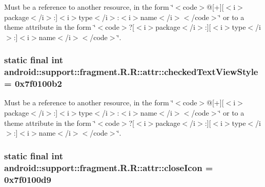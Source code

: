 Must be a reference to another resource, in the form \char`\"{}$<$code$>$@\mbox{[}+\mbox{]}\mbox{[}$<$i$>$package$<$/i$>$:\mbox{]}$<$i$>$type$<$/i$>$:$<$i$>$name$<$/i$>$$<$/code$>$\char`\"{} or to a theme attribute in the form \char`\"{}$<$code$>$?\mbox{[}$<$i$>$package$<$/i$>$:\mbox{]}\mbox{[}$<$i$>$type$<$/i$>$:\mbox{]}$<$i$>$name$<$/i$>$$<$/code$>$\char`\"{}. \hypertarget{classandroid_1_1support_1_1fragment_1_1_r_1_1attr_9e2bbe87450445856303daff538e5c41}{
\subsubsection[{checkedTextViewStyle}]{\setlength{\rightskip}{0pt plus 5cm}static final int android::support::fragment.R.R::attr::checkedTextViewStyle = 0x7f0100b2}}
\label{classandroid_1_1support_1_1fragment_1_1_r_1_1attr_9e2bbe87450445856303daff538e5c41}


Must be a reference to another resource, in the form \char`\"{}$<$code$>$@\mbox{[}+\mbox{]}\mbox{[}$<$i$>$package$<$/i$>$:\mbox{]}$<$i$>$type$<$/i$>$:$<$i$>$name$<$/i$>$$<$/code$>$\char`\"{} or to a theme attribute in the form \char`\"{}$<$code$>$?\mbox{[}$<$i$>$package$<$/i$>$:\mbox{]}\mbox{[}$<$i$>$type$<$/i$>$:\mbox{]}$<$i$>$name$<$/i$>$$<$/code$>$\char`\"{}. \hypertarget{classandroid_1_1support_1_1fragment_1_1_r_1_1attr_63fb5fce73d4cfac3a46499c56090623}{
\subsubsection[{closeIcon}]{\setlength{\rightskip}{0pt plus 5cm}static final int android::support::fragment.R.R::attr::closeIcon = 0x7f0100d9}}
\label{classandroid_1_1support_1_1fragment_1_1_r_1_1attr_63fb5fce73d4cfac3a46499c56090623}



